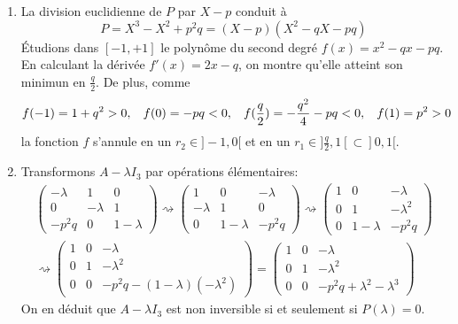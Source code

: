 \begin{enumerate}
\begin{enumerate}
 \item La division euclidienne de $P$ par $X-p$ conduit à 
 \begin{displaymath}
  P = X^3 - X^2 +p^2q = (X-p)(X^2 -qX -pq)
 \end{displaymath}
\'Etudions dans $[-1, +1]$ le polynôme du second degré $f(x) = x^2 -qx -pq$. En calculant la dérivée $f'(x) = 2x -q$, on montre qu'elle atteint son minimun en $\frac{q}{2}$. De plus, comme
\begin{displaymath}
  f(-1) = 1+q^2>0, \hspace{0.3cm} f(0)= -pq<0,\hspace{0.3cm} f(\frac{q}{2}) = -\frac{q^2}{4} - pq <0, \hspace{0.3cm}f(1) = p^2>0
\end{displaymath}
la fonction $f$ s'annule en un $r_2\in ]-1,0[$ et en un $r_1\in ]\frac{q}{2},1[ \subset ]0,1[$.

 \item Transformons $A-\lambda I_3$ par opérations élémentaires:
\begin{multline*}
\begin{pmatrix}
 -\lambda & 1 & 0 \\ 0 & -\lambda & 1 \\ -p^2q & 0 & 1 - \lambda
\end{pmatrix}
\rightsquigarrow
\begin{pmatrix}
 1 & 0 &  -\lambda \\ -\lambda & 1 & 0 \\ 0 & 1 - \lambda & -p^2q
\end{pmatrix}
\rightsquigarrow
\begin{pmatrix}
 1 & 0 &  -\lambda \\ 0 & 1 & -\lambda^2 \\ 0 & 1 - \lambda & -p^2q
\end{pmatrix} \\
\rightsquigarrow
\begin{pmatrix}
 1 & 0 &  -\lambda \\ 0 & 1 & -\lambda^2 \\ 0 & 0 & -p^2q -(1-\lambda)(-\lambda^2)
\end{pmatrix}
=
\begin{pmatrix}
 1 & 0 &  -\lambda \\ 0 & 1 & -\lambda^2 \\ 0 & 0 & -p^2q +\lambda^2 - \lambda^3
\end{pmatrix}
\end{multline*}
On en déduit que $A-\lambda I_3$ est non inversible si et seulement si $P(\lambda) = 0$.


\end{enumerate}
\end{enumerate}
